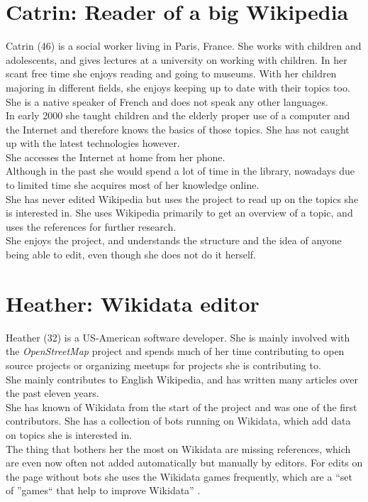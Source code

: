 \section{Catrin: Reader of a big Wikipedia}
Catrin (46) is a social worker living in Paris, France. She works with children and adolescents, and gives lectures at a university on working with children. In her scant free time she enjoys reading and going to museums. With her children majoring in different fields, she enjoys keeping up to date with their topics too. \\
She is a native speaker of French and does not speak any other languages. \\
In early 2000 she taught children and the elderly proper use of a computer and the Internet and therefore knows the basics of those topics. She has not caught up with the latest technologies however. \\
She accesses the Internet at home from her phone. \\
Although in the past she would spend a lot of time in the library, nowadays due to limited time she acquires most of her knowledge online. \\
She has never edited Wikipedia but uses the project to read up on the topics she is interested in. She uses Wikipedia primarily to get an overview of a topic, and uses the references for further research. \\
She enjoys the project, and understands the structure and the idea of anyone being able to edit, even though she does not do it herself. \\


\section{Heather: Wikidata editor}
Heather (32) is a US-American software developer. She is mainly involved with the \textit{OpenStreetMap} project and spends much of her time contributing to open source projects or organizing meetups for projects she is contributing to. \\
She mainly contributes to English Wikipedia, and has written many articles over the past eleven years. \\
She has known of Wikidata from the start of the project and was one of the first contributors. She has a collection of bots running on Wikidata, which add data on topics she is interested in. \\
The thing that bothers her the most on Wikidata are missing references, which are even now often not added automatically but manually by editors. For edits on the page without bots she uses the Wikidata games frequently, which are a ``set of ''games`` that help to improve Wikidata'' \citep{wikidatagame}.
